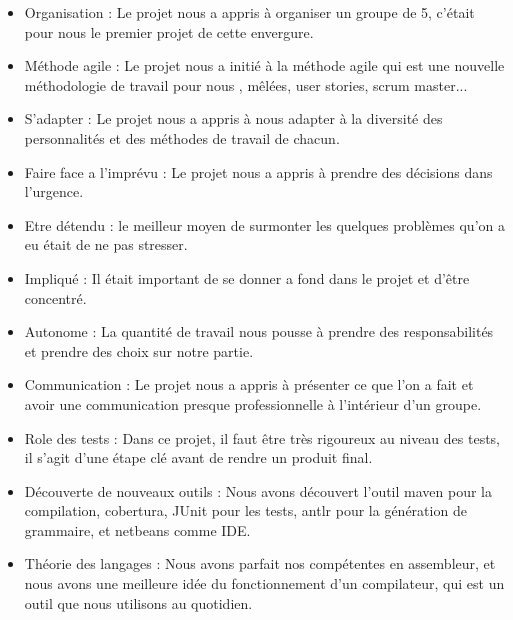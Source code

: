 \documentclass[a4paper, 12pt]{article}
\begin{document}
\begin{itemize}
\item Organisation : Le projet nous a appris à organiser
un groupe de 5, c'était pour nous le premier projet de
cette envergure.
\item Méthode agile : Le projet nous a initié à la méthode
agile qui est une nouvelle méthodologie de travail pour nous
, mêlées, user stories, scrum master...
\item S'adapter : Le projet nous a appris à nous adapter
à la diversité des personnalités et des méthodes de
travail de chacun.
\item Faire face a l'imprévu : Le projet nous a appris à prendre
des décisions dans l'urgence.
\item Etre détendu : le meilleur moyen de surmonter les quelques
problèmes qu'on a eu était de ne pas stresser.
\item Impliqué : Il était important de se donner a fond dans le
projet et d'être concentré.
\item Autonome : La quantité de travail nous pousse à prendre
des responsabilités et prendre des choix sur notre partie.
\item Communication : Le projet nous a appris à présenter ce
que l'on a fait et avoir une communication presque professionnelle
à l'intérieur d'un groupe.
\item Role des tests : Dans ce projet, il faut être très rigoureux
au niveau des tests, il s'agit d'une étape clé avant de rendre un
produit final.
\item Découverte de nouveaux outils : Nous avons découvert l'outil
maven pour la compilation, cobertura, JUnit pour les tests, antlr
pour la génération de grammaire, et netbeans comme IDE.
\item Théorie des langages : Nous avons parfait nos compétentes
en assembleur, et nous avons une meilleure idée du fonctionnement
d'un compilateur, qui est un outil que nous utilisons au quotidien.
\end{itemize}
\end{document}
